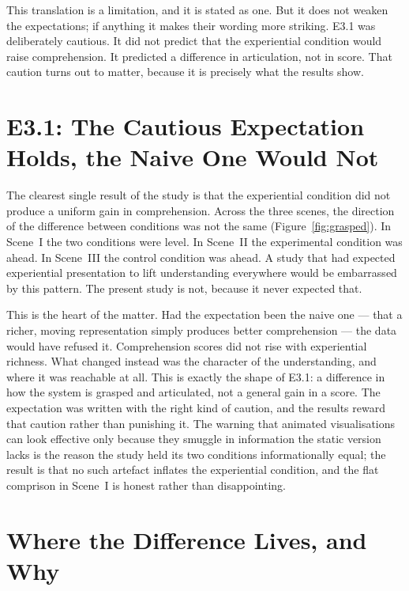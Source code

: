 This translation is a limitation, and it is stated as one. But it does not weaken the expectations; if anything it makes their wording more striking. E3.1 was deliberately cautious. It did not predict that the experiential condition would raise comprehension. It predicted a difference in articulation, not in score. That caution turns out to matter, because it is precisely what the results show.

\section{E3.1: The Cautious Expectation Holds, the Naive One Would Not}
\label{sec:disc-e31}

The clearest single result of the study is that the experiential condition did not produce a uniform gain in comprehension. Across the three scenes, the direction of the difference between conditions was not the same (Figure~\ref{fig:grasped}). In Scene~I the two conditions were level. In Scene~II the experimental condition was ahead. In Scene~III the control condition was ahead. A study that had expected experiential presentation to lift understanding everywhere would be embarrassed by this pattern. The present study is not, because it never expected that.

This is the heart of the matter. Had the expectation been the naive one --- that a richer, moving representation simply produces better comprehension --- the data would have refused it. Comprehension scores did not rise with experiential richness. What changed instead was the character of the understanding, and where it was reachable at all. This is exactly the shape of E3.1: a difference in how the system is grasped and articulated, not a general gain in a score. The expectation was written with the right kind of caution, and the results reward that caution rather than punishing it. The warning that animated visualisations can look effective only because they smuggle in information the static version lacks \parencite{tversky2002} is the reason the study held its two conditions informationally equal; the result is that no such artefact inflates the experiential condition, and the flat comprison in Scene~I is honest rather than disappointing.

\section{Where the Difference Lives, and Why}
\label{sec:disc-mechanism}

